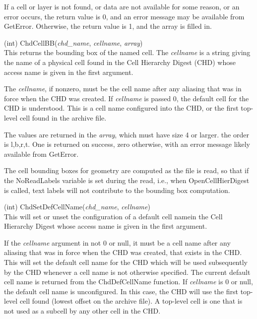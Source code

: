 \begin{description}
If a cell or layer is not found, or data are not available for some
reason, or an error occurs, the return value is 0, and an error
message may be available from {\vt GetError}.  Otherwise, the return
value is 1, and the array is filled in.

\item{(int) \vt ChdCellBB({\it chd\_name\/}, {\it cellname\/}, {\it array\/})}\\
This returns the bounding box of the named cell.  The {\it cellname}
is a string giving the name of a physical cell found in the Cell
Hierarchy Digest (CHD) whose access name is given in the first
argument.

The {\it cellname}, if nonzero, must be the cell name after any
aliasing that was in force when the CHD was created.  If {\it
cellname} is passed 0, the default cell for the CHD is understood. 
This is a cell name configured into the CHD, or the first top-level
cell found in the archive file.

The values are returned in the {\it array}, which must have size 4 or
larger.  the order is l,b,r,t.  One is returned on success, zero
otherwise, with an error message likely available from {\vt GetError}.

The cell bounding boxes for geometry are computed as the file is read,
so that if the {\et NoReadLabels} variable is set during the read,
i.e., when {\vt OpenCellHierDigest} is called, text labels will not
contribute to the bounding box computation.

\item{(int) \vt ChdSetDefCellName({\it chd\_name\/}, {\it cellname\/})}\\
This will set or unset the configuration of a default cell namein the
Cell Hierarchy Digest whose access name is given in the first
argument.

If the {\it cellname} argument in not 0 or null, it must be a cell
name after any aliasing that was in force when the CHD was created,
that exists in the CHD.  This will set the default cell name for the
CHD which will be used subsequently by the CHD whenever a cell name is
not otherwise specified.  The current default cell name is returned
from the {\vt ChdDefCellName} function.  If {\it cellname} is 0 or
null, the default cell name is unconfigured.  In this case, the CHD
will use the first top-level cell found (lowest offset on the archive
file).  A top-level cell is one that is not used as a subcell by any
other cell in the CHD.


\end{description}
